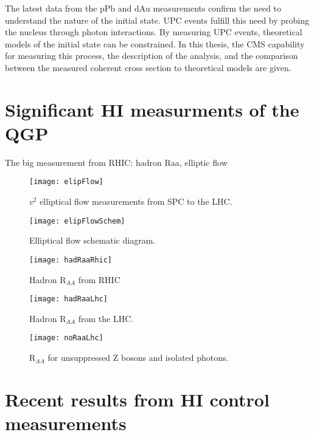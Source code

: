   The latest data from the pPb and dAu measurements confirm the need to 
    understand the nature of the initial state. 
  UPC events fulfill this need by probing the nucleus through photon 
    interactions.
  By measuring UPC \JPsi{} events, theoretical models of the initial state can 
    be constrained.
  In this thesis, the CMS capability for measuring this process, the 
  description of the analysis, and the comparison between the measured 
    coherent \JPsi{} cross section to theoretical models are given. 

  \section{Significant HI measurments of the QGP}
    The big measurement from RHIC: hadron Raa, elliptic flow
    \begin{figure}[!Hhbt]
      \centering
      \texttt{[image: elipFlow]}
      \caption{ $v^{2}$ elliptical flow measurements from SPC to the LHC.}
      \label{fig:elipFlow}
    \end{figure}

     \begin{figure}[!Hhbt]
      \centering
      \texttt{[image: elipFlowSchem]}
      \caption{ Elliptical flow schematic diagram.}
      \label{fig:elipFlowSchem}
    \end{figure}

    \begin{figure}[!Hhbt]
      \centering
      \texttt{[image: hadRaaRhic]}
      \caption{Hadron R$_{AA}$ from RHIC}
      \label{fig:hadRaaRhic}
    \end{figure}

    \begin{figure}[!Hhbt]
      \centering
      \texttt{[image: hadRaaLhc]}
      \caption{Hadron R$_{AA}$ from the LHC.}
      \label{fig:hadRaaLhc}
    \end{figure}

    \begin{figure}[!Hhbt]
      \centering
      \texttt{[image: noRaaLhc]}
      \caption{R$_{AA}$ for unsuppressed Z bosons and isolated photons.}
      \label{fig:noRaaLhc}
    \end{figure}

  \section{Recent results from HI control measurements}

